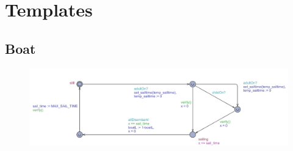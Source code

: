 \chapter{Templates}




\section{Boat}

\begin{figure}%
\includegraphics[width=\columnwidth]{pictures/boat.png}%
\caption{}%
\label{}%
\end{figure}
















